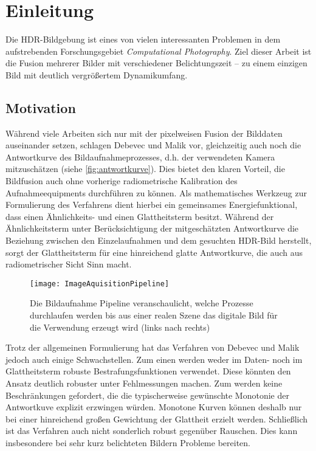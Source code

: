 \chapter{Einleitung}
Die \gls{HDR}-Bildgebung ist eines von vielen interessanten Problemen in dem aufstrebenden Forschungsgebiet \textit{Computational Photography}. Ziel dieser Arbeit ist die Fusion mehrerer Bilder mit verschiedener Belichtungszeit -- zu einem einzigen Bild mit deutlich vergrößertem Dynamikumfang.
 
\section{Motivation}


Während viele Arbeiten sich nur mit der pixelweisen Fusion der Bilddaten auseinander setzen, schlagen Debevec und Malik \cite{paper} vor, gleichzeitig auch noch die Antwortkurve des Bildaufnahmeprozesses, d.h. der verwendeten Kamera mitzuschätzen (siehe \autoref{fig:antwortkurve}). Dies bietet den klaren Vorteil, die Bildfusion auch ohne vorherige radiometrische Kalibration des Aufnahmeequipments durchführen zu können. Als mathematisches Werkzeug zur Formulierung des Verfahrens dient hierbei ein gemeinsames Energiefunktional, dass einen Ähnlichkeits- und einen  Glattheitsterm besitzt. Während der Ähnlichkeitsterm unter Berücksichtigung der mitgeschätzten Antwortkurve die Beziehung zwischen den Einzelaufnahmen und dem gesuchten HDR-Bild herstellt, sorgt der Glattheitsterm für eine hinreichend glatte Antwortkurve, die auch aus radiometrischer Sicht Sinn macht.


\begin{figure}
  \begin{center}
    \texttt{[image: ImageAquisitionPipeline]}
    \caption{Die Bildaufnahme Pipeline veranschaulicht, welche Prozesse durchlaufen werden bis aus einer realen Szene das digitale Bild für die Verwendung erzeugt wird (links nach rechts) \cite[S.2]{paper}}
    \label{fig:antwortkurve}
  \end{center}
\end{figure}


Trotz der allgemeinen Formulierung hat das Verfahren von Debevec und Malik jedoch auch einige Schwachstellen. Zum einen werden weder im Daten- noch im Glattheitsterm robuste Bestrafungsfunktionen verwendet. Diese könnten den Ansatz deutlich robuster unter Fehlmessungen machen. Zum werden keine Beschränkungen gefordert, die die typischerweise gewünschte Monotonie der Antwortkuve explizit erzwingen würden. Monotone Kurven können deshalb nur bei einer hinreichend großen Gewichtung der Glattheit erzielt werden. Schließlich ist das Verfahren auch nicht sonderlich robust gegenüber Rauschen. Dies kann insbesondere bei sehr kurz belichteten Bildern Probleme bereiten. 

